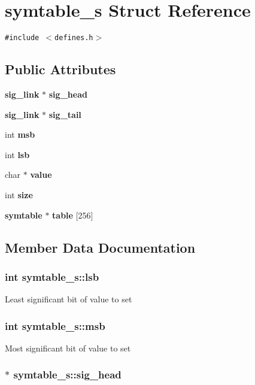 \section{symtable\_\-s Struct Reference}
\label{structsymtable__s}
{\tt \#include $<$defines.h$>$}

\subsection*{Public Attributes}
\begin{CompactItemize}
\item 
{\bf sig\_\-link} $\ast$ {\bf sig\_\-head}
\item 
{\bf sig\_\-link} $\ast$ {\bf sig\_\-tail}
\item 
int {\bf msb}
\item 
int {\bf lsb}
\item 
char $\ast$ {\bf value}
\item 
int {\bf size}
\item 
{\bf symtable} $\ast$ {\bf table} [256]
\end{CompactItemize}


\subsection{Member Data Documentation}
\subsubsection{\setlength{\rightskip}{0pt plus 5cm}int {\bf symtable\_\-s::lsb}}\label{structsymtable__s_o3}


Least significant bit of value to set 
\subsubsection{\setlength{\rightskip}{0pt plus 5cm}int {\bf symtable\_\-s::msb}}\label{structsymtable__s_o2}


Most significant bit of value to set 
\subsubsection{$\ast$ {\bf symtable\_\-s::sig\_\-head}}\label{structsymtable__s_o0}


